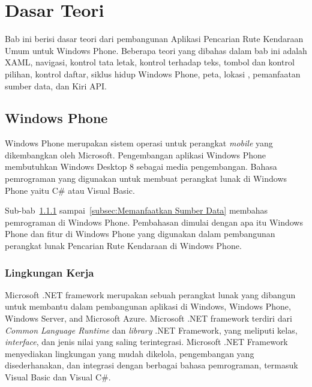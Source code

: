 \chapter{Dasar Teori}
\label{chap:teori}
Bab ini berisi dasar teori dari pembangunan Aplikasi Pencarian Rute Kendaraan Umum untuk Windows Phone. Beberapa teori yang dibahas dalam bab ini  adalah XAML, navigasi, kontrol tata letak, kontrol terhadap teks, tombol dan kontrol pilihan, kontrol daftar, siklus hidup Windows Phone, peta, lokasi , pemanfaatan sumber data, dan Kiri API. 

\section{Windows Phone}
\label{sec:Windows Phone}
\hspace{0.5cm} Windows Phone merupakan sistem operasi untuk perangkat \textit{mobile} yang dikembangkan oleh Microsoft. Pengembangan aplikasi Windows Phone membutuhkan Windows Desktop 8 sebagai media pengembangan. Bahasa pemrograman yang digunakan untuk membuat perangkat lunak di Windows Phone yaitu C\# atau Visual Basic\cite{Manning}.  

Sub-bab~\ref{subsec:Lingkungan Kerja} sampai~\ref{subsec:Memanfaatkan Sumber Data} membahas pemrograman di Windows Phone. Pembahasan dimulai dengan apa itu Windows Phone dan fitur di Windows Phone yang digunakan dalam pembangunan perangkat lunak Pencarian Rute Kendaraan di Windows Phone. 

\subsection{Lingkungan Kerja}
\label{subsec:Lingkungan Kerja}
\hspace{0.5cm} Microsoft .NET framework merupakan sebuah perangkat lunak yang dibangun untuk membantu dalam pembangunan aplikasi di Windows, Windows Phone, Windows Server, and Microsoft Azure\cite{MSDN}. Microsoft .NET framework terdiri dari \textit{Common Language Runtime} dan \textit{library} .NET Framework, yang meliputi kelas, \textit{interface}, dan jenis nilai yang saling terintegrasi. Microsoft .NET Framework menyediakan lingkungan yang mudah dikelola, pengembangan yang disederhanakan, dan integrasi dengan berbagai bahasa pemrograman, termasuk Visual Basic dan Visual C\#.

